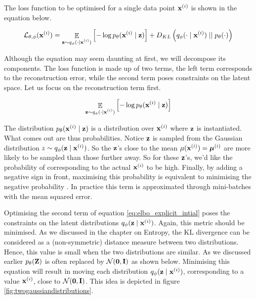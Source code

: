	The loss function to be optimised for a single data point $\mathbf{x}^{(i)}$ is shown in the equation below.
	
	\begin{equation}
		\mathcal{L}_{\theta, \phi} (\mathbf{x}^{(i)}) = \mathop{\mathbb{E}}_{\substack{\mathbf{z} \sim q_\phi (\cdot \mid \mathbf{x}^{(i)})}} \left[ -\log p_\theta (\mathbf{x}^{(i)} \mid \mathbf{z}) \right] + D_{KL} \left(  q_\phi (\cdot \mid \mathbf{x}^{(i)})  \mid \mid  p_\theta(\cdot)  \right) \label{eq:elbo_explicit_intial}
	\end{equation} %
	
	Although the equation may seem daunting at first, we will decompose its components. The loss function is made up of two terms, the left term corresponds to the reconstruction error, while the second term poses constraints on the latent space. Let us focus on the reconstruction term first.
	
	$$
	\mathop{\mathbb{E}}_{\substack{\mathbf{z} \sim q_\phi (\cdot \mid \mathbf{x}^{(i)})}} \left[ -\log p_\theta (\mathbf{x}^{(i)} \mid \mathbf{z}) \right]
	$$
	
	The distribution $p_\theta (\mathbf{x}^{(i)} \mid \mathbf{z})$ is a distribution over $\mathbf{x}^{(i)}$ where $\mathbf{z}$ is instantiated. What comes out are thus probabilities. Notice $\mathbf{z}$ is sampled from the Gaussian distribution $z \sim q_\phi (\mathbf{z} \mid \mathbf{x}^{(i)})$. So the $\mathbf{z}$'s close to the mean $\mu(\mathbf{x}^{(i)}) = \bm{\mu}^{(i)}$ are more likely to be sampled than those further away. So for these $\mathbf{z}$'s, we'd like the probability of corresponding to the actual $\mathbf{x}^{(i)}$ to be high. Finally, by adding a negative sign in front, maximising this probability is equivalent to minimising the negative probability \cite{cinelliVariationalMethodsMachine2021}. %
	In practice this term is approximated through mini-batches with the mean squared error. %
	
	
	Optimising the second term of equation \ref{eq:elbo_explicit_intial} poses the constraints on the latent distributions $q_\phi (\mathbf{z} \mid \mathbf{x}^{(i)})$. Again, this metric should be minimised. As we discussed in the chapter on Entropy, the KL divergence can be considered as a (non-symmetric) distance measure between two distributions. Hence, this value is small when the two distributions are similar. As we discussed earlier $p_\theta(\mathbf{Z})$ is often replaced by $\mathcal{N}(\bm{\mathbf{0}}, \mathbf{I})$ as shown below. Minimising this equation will result in moving each distribution $q_\phi (\mathbf{z} \mid \mathbf{x}^{(i)})$, corresponding to a value $\mathbf{x}^{(i)}$, close to $\mathcal{N}(\bm{\mathbf{0}}, \mathbf{I})$. This idea is depicted in figure \ref{fig:twogaussiandistributions}.
	
